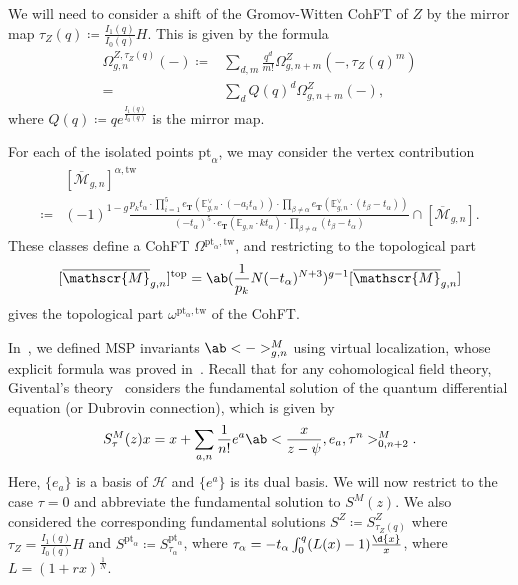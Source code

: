 \documentclass[10pt]{amsart}
\theoremstyle{definition}
\theoremstyle{remark}
\theoremstyle{plain}
\theoremstyle{definition}
\theoremstyle{remark}
\newcommand{\E}{\mathbb{E}}
\newcommand{\msc}[1]{\mathscr{#1}}
\newcommand{\T}{\mathbf{T}}
\newcommand{\mr}[1]{\mathrm{#1}}
\newcommand{\ol}[1]{\overline{#1}}
\newcommand{\1}{\mathbf{1}}
\newcommand{\2}{\mathbf{2}}
\newcommand{\3}{\mathbf{3}}
\newcommand{\pt}{\mr{pt}}
\newcommand{\tw}{\mr{tw}}
\renewcommand{\top}{\mr{top}}
\numberwithin{equation}{section}
\begin{document}
We will need to consider a shift of the Gromov-Witten CohFT of $Z$ by the mirror map $\tau_Z(q) \coloneqq \frac{I_1(q)}{I_0(q)}H$. This is given by the formula
\begin{align*}
    \Omega^{Z,\tau_Z(q)}_{g,n}(-) \coloneqq{}& \sum_{d,m} \frac{q^d}{m!} \Omega^Z_{g,n+m}(-,\tau_Z(q)^m) \\
    ={}& \sum_{d} Q(q)^d \Omega^Z_{g,n+m}(-),
\end{align*}
where $Q(q) \coloneqq qe^{\frac{I_1(q)}{I_0(q)}}$ is the mirror map. 


For each of the isolated points $\pt_{\alpha}$, we may consider the vertex contribution
\begin{align*}
    &[\ol{\msc{M}}_{g,n}]^{\alpha, \tw} \\ 
    \coloneqq{} &(-1)^{1-g} \frac{p_k t_{\alpha} \cdot \prod_{i=1}^5 e_{\T}(\E_{g,n}^{\vee}\cdot (-a_i t_{\alpha})) \cdot \prod_{\beta \neq \alpha} e_{\T}(\E_{g,n}^{\vee} \cdot (t_{\beta} - t_{\alpha}))}{(-t_{\alpha})^5 \cdot e_{\T}(\E_{g,n} \cdot kt_{\alpha}) \cdot \prod_{\beta \neq \alpha} (t_{\beta} - t_{\alpha})} \cap [\ol{\msc{M}}_{g,n}].
\end{align*}
These classes define a CohFT $\Omega^{\pt_{\alpha},\tw}$, and restricting to the topological part
\[ [\ol{\msc{M}}_{g,n}]^{\top} = \ab(\frac{1}{p_k} N(-t_{\alpha})^{N+3})^{g-1} [\ol{\msc{M}}_{g,n}] \]
gives the topological part $\omega^{\pt_{\alpha},\tw}$ of the CohFT.


In~\cite[\S 2.1]{polynomiality}, we defined MSP invariants $\ab<->^M_{g,n}$ using virtual localization, whose explicit formula was proved in~\cite[\S 5]{foundations}. Recall that for any cohomological field theory, Givental's theory~\cite{symplfrob} considers the fundamental solution of the quantum differential equation (or Dubrovin connection), which is given by
\[ S^M_{\tau}(z)x = x + \sum_{a, n} \frac{1}{n!} e^a \ab<\frac{x}{z-\psi}, e_a, \tau^n>_{0,n+2}^M. \]
Here, $\{e_a\}$ is a basis of $\msc{H}$ and $\{e^a\}$ is its dual basis. We will now restrict to the case $\tau = 0$ and abbreviate the fundamental solution to $S^M(z)$. We also considered the corresponding fundamental solutions $S^Z \coloneqq S^Z_{\tau_Z(q)}$ where $\tau_Z = \frac{I_1(q)}{I_0(q)}H$ and $S^{\pt_{\alpha}} \coloneqq S_{\tau_{\alpha}}^{\pt_{\alpha}}$, where $\tau_{\alpha} = -t_{\alpha} \int_0^{q} (L(x)-1) \frac{\d{x}}{x}$, where $L = (1+rx)^{\frac{1}{N}}$.
\end{document}
